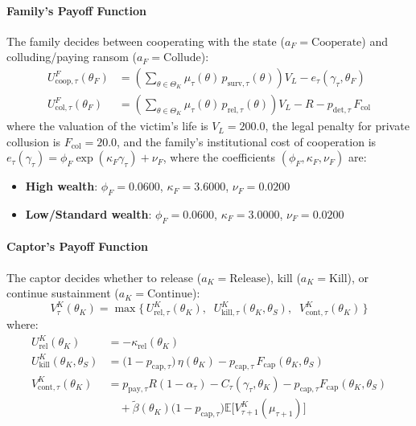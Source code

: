 \documentclass[12pt]{article}
\numberwithin{equation}{section}
\numberwithin{table}{section}
\begin{document}
\paragraph{Family's Payoff Function}
The family decides between cooperating with the state ($a_F = \text{Cooperate}$) and colluding/paying ransom ($a_F = \text{Collude}$):
\begin{align}
U^F_{\text{coop},\tau}(\theta_F) &= \left(\sum_{\theta\in\Theta_K}\mu_\tau(\theta)\, p_{\text{surv},\tau}(\theta)\right) V_L - e_\tau(\gamma_\tau,\theta_F) \\
U^F_{\text{col},\tau}(\theta_F) &= \left(\sum_{\theta\in\Theta_K}\mu_\tau(\theta)\, p_{\text{rel},\tau}(\theta)\right) V_L - R - p_{\text{det},\tau}\, F_{\text{col}}
\end{align}
where the valuation of the victim's life is $V_L = 200.0$, the legal penalty for private collusion is $F_{\text{col}} = 20.0$, and the family's institutional cost of cooperation is $e_\tau(\gamma_\tau) = \phi_F \exp(\kappa_F \gamma_\tau) + \nu_F$, where the coefficients $(\phi_F, \kappa_F, \nu_F)$ are:
\begin{itemize}
    \item \textbf{High wealth}: $\phi_F = 0.0600$, $\kappa_F = 3.6000$, $\nu_F = 0.0200$
    \item \textbf{Low/Standard wealth}: $\phi_F = 0.0600$, $\kappa_F = 3.0000$, $\nu_F = 0.0200$
\end{itemize}

\paragraph{Captor's Payoff Function}
The captor decides whether to release ($a_K = \text{Release}$), kill ($a_K = \text{Kill}$), or continue sustainment ($a_K = \text{Continue}$):
\begin{equation}
V^K_\tau(\theta_K) = \max\Big\{\, U^K_{\text{rel},\tau}(\theta_K),\;\; U^K_{\text{kill},\tau}(\theta_K,\theta_S),\;\; V^K_{\text{cont},\tau}(\theta_K) \,\Big\}
\end{equation}
where:
\begin{align}
U^K_{\text{rel}}(\theta_K) &= -\kappa_{\text{rel}}(\theta_K) \\
U^K_{\text{kill}}(\theta_K,\theta_S) &= \big(1- p_{\text{cap},\tau}\big)\,\eta(\theta_K) - p_{\text{cap},\tau}\, F_{\text{cap}}(\theta_K,\theta_S) \\
V^K_{\text{cont},\tau}(\theta_K) &= p_{\text{pay},\tau} R (1 - \alpha_\tau) - C_\tau(\gamma_\tau,\theta_K) - p_{\text{cap},\tau} F_{\text{cap}}(\theta_K,\theta_S) \nonumber \\
&\quad + \tilde{\beta}(\theta_K) \big(1- p_{\text{cap},\tau}\big) \mathbb{E}\big[ V^K_{\tau+1}(\mu_{\tau+1}) \big]
\end{align}
\end{document}
